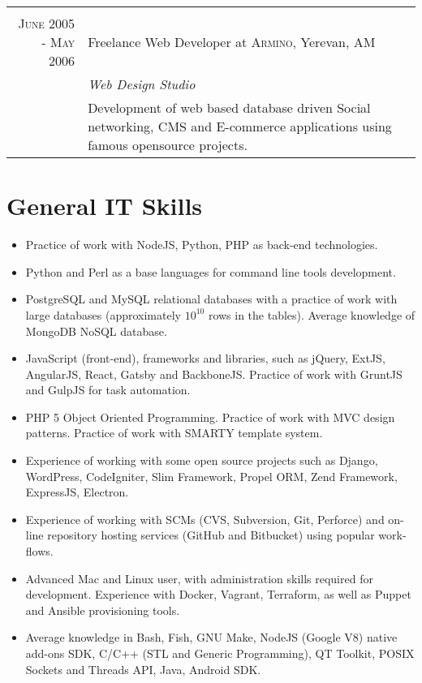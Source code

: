\documentclass[a4paper,10pt]{article}
\begin{document}
\begin{tabular}{r|p{11cm}}
\multicolumn{2}{c}{} \\


\textsc{June 2005 - May 2006}
  & Freelance Web Developer at \textsc{Armino}, Yerevan, AM \\
  & \emph{Web Design Studio}\\
  & \footnotesize{Development of web based database driven Social networking,
    CMS and E-commerce applications using famous opensource projects.}

\end{tabular}


\section{General IT Skills}
\begin{itemize}
  \item[] Practice of work with NodeJS, Python, PHP as back-end technologies.
  \item[] Python and Perl as a base languages for command line tools
          development.
  \item[] PostgreSQL and MySQL relational databases with a practice of work
          with large databases (approximately $10^{10}$ rows in the tables).
          Average knowledge of MongoDB NoSQL database.
  \item[] JavaScript (front-end), frameworks and libraries, such as jQuery,
          ExtJS, AngularJS, React, Gatsby and BackboneJS. Practice of work with GruntJS and GulpJS for task automation.
  \item[] PHP 5 Object Oriented Programming. Practice of work with MVC design
          patterns. Practice of work with SMARTY template system.
  \item[] Experience of working with some open source projects such as Django,
          WordPress, CodeIgniter, Slim Framework, Propel ORM, Zend Framework,
          ExpressJS, Electron.
  \item[] Experience of working with SCMs (CVS, Subversion, Git, Perforce) and
          on-line repository hosting services (GitHub and Bitbucket) using
          popular work-flows.
  \item[] Advanced Mac and Linux user, with administration skills required for
          development. Experience with Docker, Vagrant, Terraform, as well as
          Puppet and Ansible provisioning tools.
  \item[] Average knowledge in Bash, Fish, GNU Make, NodeJS (Google V8) native
          add-ons SDK, C/C++ (STL and Generic Programming), QT Toolkit, POSIX
          Sockets and Threads API, Java, Android SDK.
\end{itemize}
\end{document}
